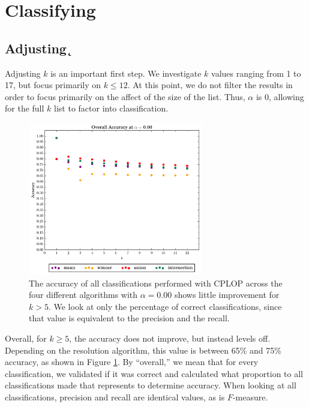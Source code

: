 \section{Classifying}

\subsection{Adjusting \k{}}
Adjusting $k$ is an important first step. We investigate $k$ values ranging from 1 to 17, but focus primarily on $k \leq 12$. At this point, we do not filter the results in order to focus primarily on the affect of the size of the \knn{} list. Thus, $\alpha$ is 0, allowing for the full $k$ list to factor into classification.

\begin{figure}[t]
\centering
\includegraphics[width=3in]{figures/krap/Overall-ALL-metrics-12-0_000_new}
\caption{The accuracy  of all classifications performed with CPLOP across the four different algorithms with $\alpha=0.00$ shows little improvement for $k>5$. We look at only the percentage of correct classifications, since that value is equivalent to the precision and the recall.}
\label{fig:k_overall}
\end{figure}
Overall, for $k\geq5$, the accuracy does not improve, but instead levels off. Depending on the resolution algorithm, this value is between 65\% and 75\% accuracy, as shown in Figure \ref{fig:k_overall}. By ``overall,'' we mean that for every classification, we validated if it was correct and calculated what proportion to all classifications made that represents to determine accuracy. When looking at all classifications, precision and recall are identical values, as is $F$-measure.


